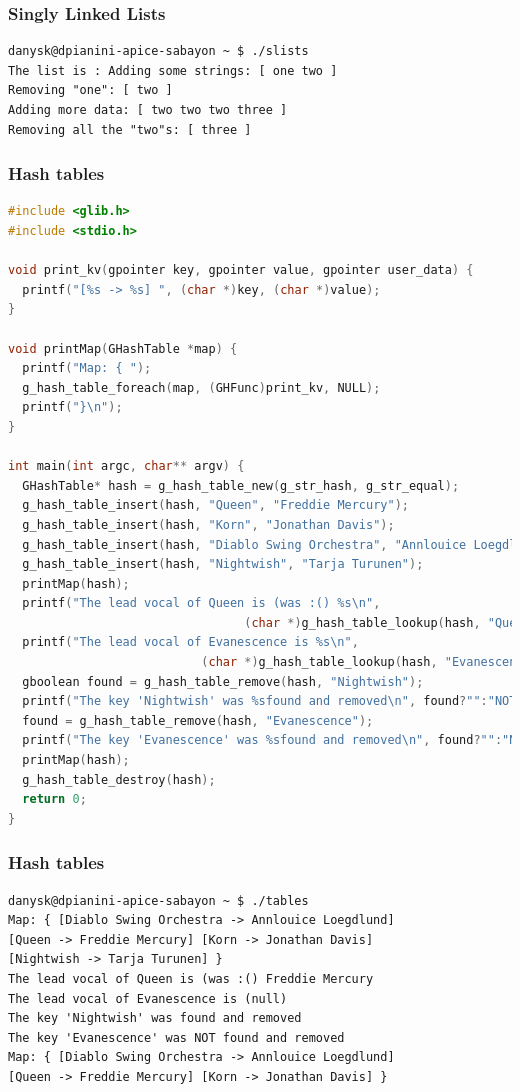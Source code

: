 \documentclass{beamer}
\begin{document}
\begin{frame}[fragile]
\frametitle{Singly Linked Lists}
\begin{verbatim}
danysk@dpianini-apice-sabayon ~ $ ./slists 
The list is : Adding some strings: [ one two ]
Removing "one": [ two ]
Adding more data: [ two two two three ]
Removing all the "two"s: [ three ]
\end{verbatim}
\end{frame}

\begin{frame}[fragile]
\frametitle{Hash tables}
\begin{lstlisting}[language=C]
#include <glib.h>
#include <stdio.h>

void print_kv(gpointer key, gpointer value, gpointer user_data) {
  printf("[%s -> %s] ", (char *)key, (char *)value);
}

void printMap(GHashTable *map) {
  printf("Map: { ");
  g_hash_table_foreach(map, (GHFunc)print_kv, NULL);
  printf("}\n");
}

int main(int argc, char** argv) {
  GHashTable* hash = g_hash_table_new(g_str_hash, g_str_equal);
  g_hash_table_insert(hash, "Queen", "Freddie Mercury");
  g_hash_table_insert(hash, "Korn", "Jonathan Davis");
  g_hash_table_insert(hash, "Diablo Swing Orchestra", "Annlouice Loegdlund");
  g_hash_table_insert(hash, "Nightwish", "Tarja Turunen");
  printMap(hash);
  printf("The lead vocal of Queen is (was :() %s\n",
                                 (char *)g_hash_table_lookup(hash, "Queen"));
  printf("The lead vocal of Evanescence is %s\n",
                           (char *)g_hash_table_lookup(hash, "Evanescence"));
  gboolean found = g_hash_table_remove(hash, "Nightwish");
  printf("The key 'Nightwish' was %sfound and removed\n", found?"":"NOT ");
  found = g_hash_table_remove(hash, "Evanescence");
  printf("The key 'Evanescence' was %sfound and removed\n", found?"":"NOT ");
  printMap(hash);
  g_hash_table_destroy(hash);
  return 0;
}
\end{lstlisting}
\end{frame}

\begin{frame}[fragile]
\frametitle{Hash tables}
\begin{verbatim}
danysk@dpianini-apice-sabayon ~ $ ./tables 
Map: { [Diablo Swing Orchestra -> Annlouice Loegdlund]
[Queen -> Freddie Mercury] [Korn -> Jonathan Davis]
[Nightwish -> Tarja Turunen] }
The lead vocal of Queen is (was :() Freddie Mercury
The lead vocal of Evanescence is (null)
The key 'Nightwish' was found and removed
The key 'Evanescence' was NOT found and removed
Map: { [Diablo Swing Orchestra -> Annlouice Loegdlund]
[Queen -> Freddie Mercury] [Korn -> Jonathan Davis] }
\end{verbatim}
\end{frame}
\end{document}
